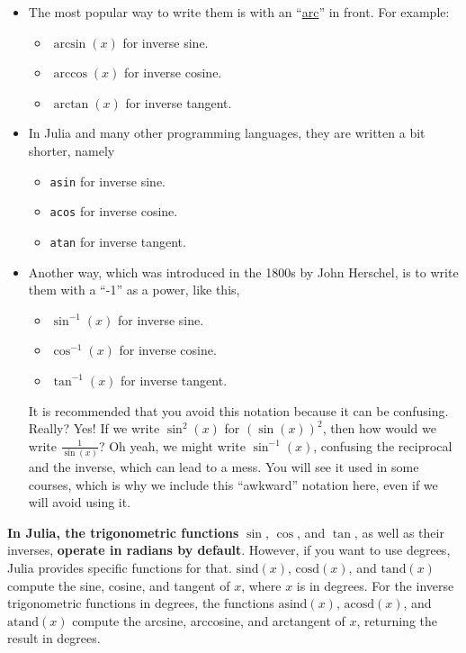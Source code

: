 \begin{itemize}
    \item The most popular way to write them is with an ``\href{https://math.stackexchange.com/questions/33175/etymology-of-arccos-arcsin-arctan#:~:text=When%20measuring%20in,of%20the%20circle.}{arc}'' in front. For example:
    \begin{itemize}
        \item $\arcsin(x)$ for inverse sine.
        \item $\arccos(x)$ for inverse cosine.
        \item $\arctan(x)$ for inverse tangent.
    \end{itemize}
    
    \item In Julia and many other programming languages, they are written a bit shorter, namely
    \begin{itemize}
        \item \texttt{asin} for inverse sine.
        \item \texttt{acos} for inverse cosine.
        \item \texttt{atan} for inverse tangent.
    \end{itemize}
    
    \item Another way, which was introduced in the 1800s by John Herschel, is to write them with a ``-1'' as a power, like this,
    \begin{itemize}
        \item $\sin^{-1}(x)$ for inverse sine.
        \item $\cos^{-1}(x)$ for inverse cosine.
        \item $\tan^{-1}(x)$ for inverse tangent.
    \end{itemize}
    It is recommended that you avoid this notation because it can be confusing. Really? Yes! If we write $\sin^2(x)$ for $(\sin(x))^2$, then how would we write $\frac{1}{\sin(x)}$?  Oh yeah, we might write $\sin^{-1}(x)$, confusing the reciprocal and the inverse, which can lead to a mess. You will see it used in some courses, which is why we include this ``awkward'' notation here, even if we will avoid using it.
\end{itemize}

\begin{rem} \textbf{In Julia, the trigonometric functions} $\sin$, $\cos$, and $\tan$, as well as their inverses, \textbf{operate in radians by default}. However, if you want to use degrees, Julia provides specific functions for that. $\mathrm{sind}(x)$, $\mathrm{cosd}(x)$, and $\mathrm{tand}(x)$ compute the sine, cosine, and tangent of $x$,  where  $x$ is in degrees. For the inverse trigonometric functions in degrees, the functions $\mathrm{asind}(x)$, $\mathrm{acosd}(x)$, and $\mathrm{atand}(x)$ compute the arcsine, arccosine, and arctangent of $x$, returning the result in degrees.
\Qed
\end{rem}

